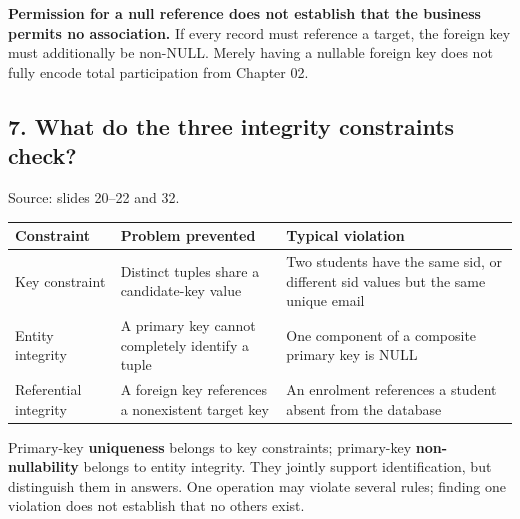 \textbf{Permission for a null reference does not establish that the business permits no association.} If every record must reference a target, the foreign key must additionally be non-NULL. Merely having a nullable foreign key does not fully encode total participation from Chapter 02.

\subsection{7. What do the three integrity constraints check?}\label{03_relational_model_and_integrity_en-what-do-the-three-integrity-constraints-check}

Source: slides 20--22 and 32.

\begin{longtable}[]{@{}
  >{\raggedright\arraybackslash}p{}
  >{\raggedright\arraybackslash}p{}
  >{\raggedright\arraybackslash}p{}@{}}
\toprule\noalign{}
\begin{minipage}[b]{\linewidth}\raggedright
Constraint
\end{minipage} & \begin{minipage}[b]{\linewidth}\raggedright
Problem prevented
\end{minipage} & \begin{minipage}[b]{\linewidth}\raggedright
Typical violation
\end{minipage} \\
\midrule\noalign{}
\endhead
\bottomrule\noalign{}
\endlastfoot
Key constraint & Distinct tuples share a candidate-key value & Two students have the same sid, or different sid values but the same unique email \\
Entity integrity & A primary key cannot completely identify a tuple & One component of a composite primary key is NULL \\
Referential integrity & A foreign key references a nonexistent target key & An enrolment references a student absent from the database \\
\end{longtable}

Primary-key \textbf{uniqueness} belongs to key constraints; primary-key \textbf{non-nullability} belongs to entity integrity. They jointly support identification, but distinguish them in answers. One operation may violate several rules; finding one violation does not establish that no others exist.

